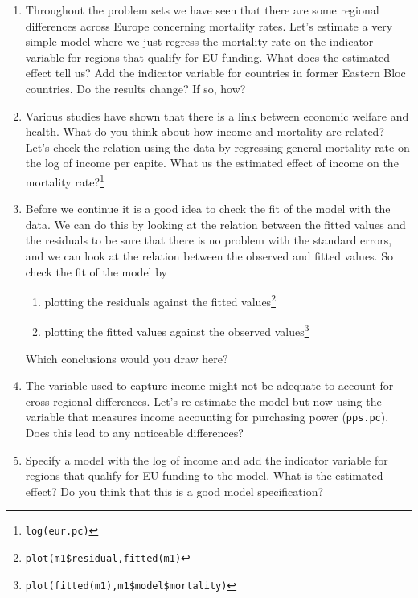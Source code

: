 \documentclass{tufte-handout}
\begin{document}
\begin{enumerate}
  
  \item Throughout the problem sets we have seen that there are some regional differences across Europe concerning mortality rates. 
  Let's estimate a very simple model where we just regress the mortality rate on the indicator variable for regions that qualify for EU funding.
  What does the estimated effect tell us? 
  Add the indicator variable for countries in former Eastern Bloc countries. 
  Do the results change? If so, how?

  \item Various studies have shown that there is a link between economic welfare and health. 
  What do you think about how income and mortality are related? 
  Let's check the relation using the data by regressing general mortality rate on the log of income per capite. 
  What us the estimated effect of income on the mortality rate?\footnote{\texttt{log(eur.pc)}}
  
  \item Before we continue it is a good idea to check the fit of the model with the data. 
  We can do this by looking at the relation between the fitted values and the residuals to be sure that there is no problem with the standard errors, and we can look at the relation between the observed and fitted values. 
  So check the fit of the model by
  \begin{enumerate}
    \item plotting the residuals against the fitted values\footnote{\texttt{plot(m1\$residual,fitted(m1)}}
    \item plotting the fitted values against the observed values\footnote{\texttt{plot(fitted(m1),m1\$model\$mortality)}}
  \end{enumerate}  
  Which conclusions would you draw here?

  
  \item The variable used to capture income might not be adequate to account for cross-regional differences. 
  Let's re-estimate the model but now using the variable that measures income accounting for purchasing power (\texttt{pps.pc}).
  Does this lead to any noticeable differences?
  
  \item Specify a model with the log of income and add the indicator variable for regions that qualify for EU funding to the model. 
  What is the estimated effect?
  Do you think that this is a good model specification?


\end{enumerate}
\end{document}
